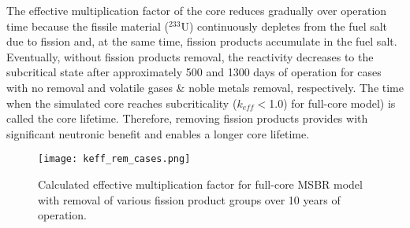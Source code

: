 The effective multiplication factor of the core reduces gradually over 
operation time because the fissile material ($^{233}$U) continuously depletes 
from the fuel salt due to fission and, at the same time, fission products 
accumulate in the fuel salt.	Eventually, without fission products removal, 
the reactivity decreases to the subcritical state after approximately 500 and 
1300 days of operation for cases with no removal and volatile gases \& noble 
metals removal, respectively. The time when the simulated core reaches 
subcriticality ($k_{eff}<$1.0) for full-core model) is called the core lifetime. 
Therefore, removing fission products provides with significant neutronic benefit 
and enables a longer core lifetime.
\begin{figure}[ht!] %
  \centering
  \texttt{[image: keff\_rem\_cases.png]} 
  \caption{Calculated effective multiplication factor for full-core \gls{MSBR} 
model with removal of various fission product groups over 10 years of 
operation.}
  \label{fig:fp_removal}
\end{figure}
